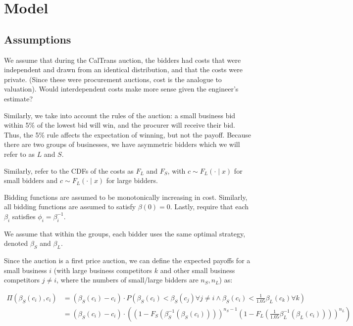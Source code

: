 \section{Model}

\subsection{Assumptions}

We assume that during the CalTrans auction, the bidders had costs that
were independent and drawn from an identical distribution, and that the costs
were private. (Since these were procurement auctions, cost is the analogue to
valuation).
Would interdependent costs make more sense given the engineer's estimate?

Similarly, we take into account the rules of the auction: a small business bid
within 5\% of the lowest bid will win, and the procurer will receive their
bid. Thus, the 5\% rule affects the expectation of winning, but not the payoff.
Because there are two groups of businesses, we have asymmetric bidders which
we will refer to as \(L\) and \(S\).

Similarly, refer to the CDFs of the costs as \(F_{L}\) and \(F_{S}\),
with \(c \sim F_L(\cdot \mid x)\) for small bidders and
\(c \sim F_L(\cdot \mid x)\) for large bidders.
 
Bidding functions are assumed to be monotonically increasing in cost.
Similarly, all bidding functions are assumed to satisfy \(\beta(0) = 0\).
Lastly, require that each \(\beta_{i}\) satisfies \(\phi_{i} = \beta_{i}^{-1}\).

We assume that within the groups, each bidder uses the same optimal strategy,
denoted \(\beta_S\) and \(\beta_L\).


Since the auction is a first price auction, we can define the expected payoffs
for a small business \(i\) (with large business competitors \(k\) and
other small business competitors \(j \ne i\), where the numbers of
small/large bidders are \(n_S, n_L\)) as:

\[
  \begin{aligned}
  \Pi(\beta_S (c_i), c_i) &= (\beta_S(c_i) - c_i) \cdot
    P \left( \beta_S (c_i) < \beta_S(c_j) \forall j \neq i \land
    \beta_S (c_i) < \frac{1}{1.05} \beta_L(c_k) \forall k \right) \\
  &= (\beta_S(c_i) - c_i) \cdot \left(
    \left( 1 - F_S(\beta_{S}^{-1}(\beta_S(c_i))) \right)^{n_S - 1}
    \left( 1 - F_L(\frac{1}{1.05} \beta_{L}^{-1}(\beta_L(c_i))) \right)^{n_L} \right)
  \end{aligned}
\]

